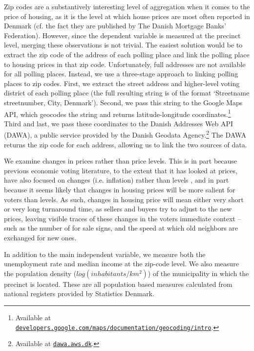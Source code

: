 \documentclass[12pt,a4paper]{article}
\begin{document}
Zip codes are a substantively interesting level of aggregation when it comes to the price of housing, as it is the level at which house prices are most often reported in Denmark (cf. the fact they are published by The Danish Mortgage Banks' Federation). However, since the dependent variable is measured at the precinct level, merging these observations is not trivial. The easiest solution would be to extract the zip code of the address of each polling place and link the polling place to housing prices in that zip code. Unfortunately, full addresses are not available for all polling places. Instead, we use a three-stage approach to linking polling places to zip codes. First, we extract the street address and higher-level voting district of each polling place (the full resulting string is of the format `Streetname streetnumber, City, Denmark'). Second, we pass this string to the Google Maps API, which geocodes the string and returns latitude-longitude coordinates.\footnote{Available at \texttt{\href{https://developers.google.com/maps/documentation/geocoding/intro}{developers.google.com/maps/documentation/geocoding/intro}}.} Third and last, we pass these coordinates to the Danish Addresses Web API (DAWA), a public service provided by the Danish Geodata Agency.\footnote{Available at \texttt{\href{http://dawa.aws.dk/}{dawa.aws.dk}}.} The DAWA returns the zip code for each address, allowing us to link the two sources of data. %

We examine changes in prices rather than price levels. This is in part because previous economic voting literature, to the extent that it has looked at prices, have also focused on changes (i.e. inflation) rather than levels \citep[cf.][]{kramer1971short}, and in part because it seems likely that changes in housing prices will be more salient for voters than levels. As such, changes in housing price will mean either very short or very long turnaround time, as sellers and buyers try to adjust to the new prices, leaving visible traces of these changes in the voters immediate context -- such as the number of for sale signs, and the speed at which old neighbors are exchanged for new ones.

In addition to the main independent variable, we measure both the unemployment rate and median income at the zip-code level. We also measure the population density ($log(inhabitants/km^2)$) of the municipality in which the precinct is located. These are all population based measures calculated from national registers provided by Statistics Denmark.
\end{document}
